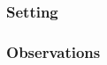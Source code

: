 \documentclass[11pt]{article}
\begin{document}
\subsubsection{Setting}

\subsubsection{Observations}
\end{document}
